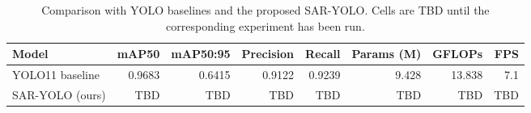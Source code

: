 \begin{table}[t]
\centering
\caption{Comparison with YOLO baselines and the proposed SAR-YOLO. Cells are TBD until the corresponding experiment has been run.}
\label{tab:baseline_comparison}
\begin{tabular}{lrrrrrrr}
\toprule
Model & mAP50 & mAP50:95 & Precision & Recall & Params (M) & GFLOPs & FPS \\
\midrule
YOLO11 baseline & 0.9683 & 0.6415 & 0.9122 & 0.9239 & 9.428 & 13.838 & 7.1 \\
SAR-YOLO (ours) & TBD & TBD & TBD & TBD & TBD & TBD & TBD \\
\bottomrule
\end{tabular}
\end{table}
